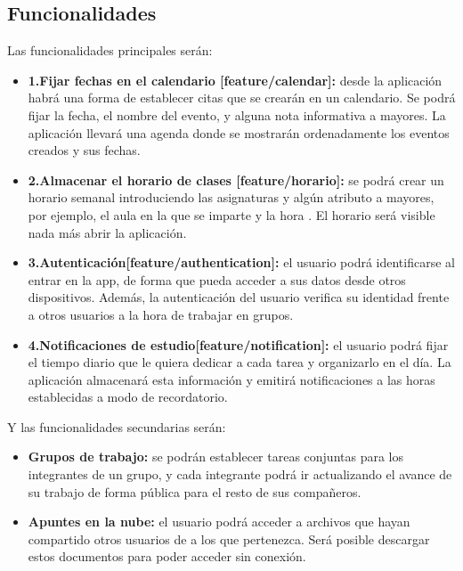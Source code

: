 \documentclass[a4paper,openright,12pt]{article}
\begin{document}
\subsection{Funcionalidades}
Las funcionalidades principales serán:
\begin{itemize}
\item \textbf{1.Fijar fechas en el calendario [feature/calendar]:} desde la aplicación habrá una forma de establecer citas que se crearán en un calendario. Se podrá fijar la fecha, el nombre del evento, y alguna nota informativa a mayores. La aplicación llevará una agenda donde se mostrarán ordenadamente los eventos creados y sus fechas.

\item \textbf{2.Almacenar el horario de clases [feature/horario]:} se podrá crear un horario semanal introduciendo las asignaturas y algún atributo a mayores, por ejemplo, el aula en la que se imparte y la hora . El horario será visible nada más abrir la aplicación.

\item \textbf{3.Autenticación[feature/authentication]:} el usuario podrá identificarse al entrar en la app, de forma que pueda acceder a sus datos desde otros dispositivos. Además, la autenticación del usuario verifica su identidad frente a otros usuarios a la hora de trabajar en grupos.

\item \textbf{4.Notificaciones de estudio[feature/notification]:} el usuario podrá fijar el tiempo diario que le quiera dedicar a cada tarea y organizarlo en el día. La aplicación almacenará esta información y emitirá notificaciones a las horas establecidas a modo de recordatorio.


\end{itemize}

Y las funcionalidades secundarias serán:
\begin{itemize}

\item \textbf{Grupos de trabajo:} se podrán establecer tareas conjuntas para los integrantes de un grupo, y cada integrante podrá ir actualizando el avance de su trabajo de forma pública para el resto de sus compañeros.

\item \textbf{Apuntes en la nube:} el usuario podrá acceder a archivos que hayan compartido otros usuarios de a los que pertenezca. Será posible descargar estos documentos para poder acceder sin conexión. 
\end{itemize}
\end{document}
